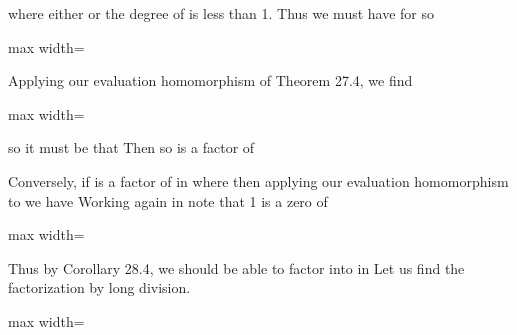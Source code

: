 \documentclass[11pt,oneside]{article}
\begin{document}
\begin{BookBody}

\noindent where either  or the degree of  is less than 1. Thus we must have  for  so

\begin{center}\begin{adjustbox}{max width=\linewidth}\end{adjustbox}\end{center}

\noindent Applying our evaluation homomorphism of Theorem 27.4, we find

\begin{center}\begin{adjustbox}{max width=\linewidth}\end{adjustbox}\end{center}

\noindent so it must be that  Then  so  is a factor of 

Conversely, if  is a factor of  in  where  then applying our evaluation homomorphism  to  we have  Working again in  note that 1 is a zero of


\begin{center}\begin{adjustbox}{max width=\linewidth}\end{adjustbox}\end{center}

\noindent Thus by Corollary 28.4, we should be able to factor  into  in  Let us find the factorization by long division.

\begin{center}\begin{adjustbox}{max width=\linewidth}\end{adjustbox}\end{center}


\end{BookBody}
\end{document}

